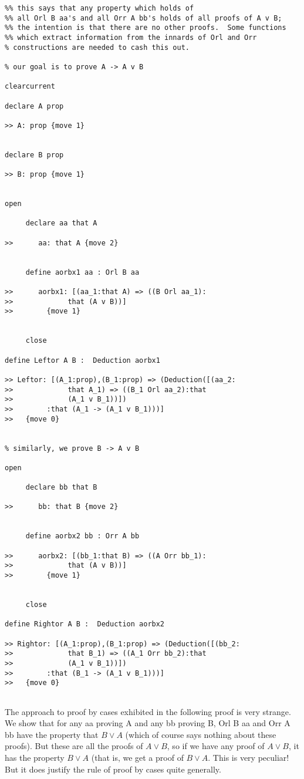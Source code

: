 \documentclass[12pt]{article}
\begin{document}
\begin{verbatim}
%% this says that any property which holds of 
%% all Orl B aa's and all Orr A bb's holds of all proofs of A v B;
%% the intention is that there are no other proofs.  Some functions
%% which extract information from the innards of Orl and Orr
% constructions are needed to cash this out.

% our goal is to prove A -> A v B

clearcurrent

declare A prop

>> A: prop {move 1}


declare B prop

>> B: prop {move 1}


open

     declare aa that A

>>      aa: that A {move 2}


     define aorbx1 aa : Orl B aa

>>      aorbx1: [(aa_1:that A) => ((B Orl aa_1):
>>             that (A v B))]
>>        {move 1}


     close

define Leftor A B :  Deduction aorbx1

>> Leftor: [(A_1:prop),(B_1:prop) => (Deduction([(aa_2:
>>             that A_1) => ((B_1 Orl aa_2):that 
>>             (A_1 v B_1))])
>>        :that (A_1 -> (A_1 v B_1)))]
>>   {move 0}


% similarly, we prove B -> A v B

open

     declare bb that B

>>      bb: that B {move 2}


     define aorbx2 bb : Orr A bb

>>      aorbx2: [(bb_1:that B) => ((A Orr bb_1):
>>             that (A v B))]
>>        {move 1}


     close

define Rightor A B :  Deduction aorbx2

>> Rightor: [(A_1:prop),(B_1:prop) => (Deduction([(bb_2:
>>             that B_1) => ((A_1 Orr bb_2):that 
>>             (A_1 v B_1))])
>>        :that (B_1 -> (A_1 v B_1)))]
>>   {move 0}


\end{verbatim}

The approach to proof by cases exhibited in the following proof is very strange.  We show that for any aa proving A
and any bb proving B, Orl B aa and Orr A bb have the property that $B \vee A$ (which of course says nothing about these proofs).
But these are all the proofs of $A \vee B$, so if we have any proof of $A \vee B$, it has the property $B \vee A$ (that is, we get
a proof of $B \vee A$.  This is very peculiar!  But it does justify the rule of proof by cases quite generally.
\end{document}

